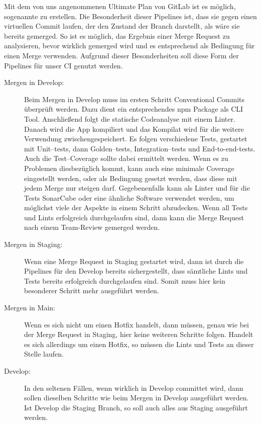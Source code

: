 Mit dem von uns angenommenen Ultimate Plan von GitLab ist es möglich, sogenannte  zu erstellen.
Die Besonderheit dieser Pipelines ist, dass sie gegen einen virtuellen Commit laufen, der den Zustand der Branch darstellt, als wäre sie bereits gemerged.
So ist es möglich, das Ergebnis einer Merge Request zu analysieren, bevor wirklich gemerged wird und es entsprechend als Bedingung für einen Merge verwenden.
Aufgrund dieser Besonderheiten soll diese Form der Pipelines für unser CI genutzt werden.

\begin{description}
    \item[Mergen in Develop:]
        Beim Mergen in Develop muss im ersten Schritt Conventional Commits überprüft werden.
        Dazu dient ein entsprechendes npm Package als CLI Tool.
        Anschließend folgt die statische Codeanalyse mit einem Linter.
        Danach wird die App kompiliert und das Kompilat wird für die weitere Verwendung zwischengespeichert.
        Es folgen verschiedene Tests, gestartet mit Unit--tests, dann Golden--tests, Integration--tests und End-to-end-tests.
        Auch die Test--Coverage sollte dabei ermittelt werden.
        Wenn es zu Problemen diesbezüglich kommt, kann auch eine minimale Coverage eingestellt werden, oder als Bedingung gesetzt werden, dass diese mit jedem Merge nur steigen darf.
        Gegebenenfalls kann als Linter und für die Tests SonarCube oder eine ähnliche Software verwendet werden, um möglichst viele der Aspekte in einem Schritt abzudecken.
        Wenn all Tests und Lints erfolgreich durchgelaufen sind, dann kann die Merge Request nach einem Team-Review gemerged werden.


    \item[Mergen in Staging:]
        Wenn eine Merge Request in Staging gestartet wird, dann ist durch die Pipelines für den Develop bereits sichergestellt, dass sämtliche Lints und Tests bereits erfolgreich durchgelaufen sind.
        Somit muss hier kein besonderer Schritt mehr ausgeführt werden.


    \item[Mergen in Main:]
        Wenn es sich nicht um einen Hotfix handelt, dann müssen, genau wie bei der Merge Request in Staging, hier keine weiteren Schritte folgen.
        Handelt es sich allerdings um einen Hotfix, so müssen die Lints und Tests an dieser Stelle laufen.


    \item[Develop:]
        In den seltenen Fällen, wenn wirklich in Develop committet wird, dann sollen dieselben Schritte wie beim Mergen in Develop ausgeführt werden.
        Ist Develop die Staging Branch, so soll auch alles aus Staging ausgeführt werden.


\end{description}
